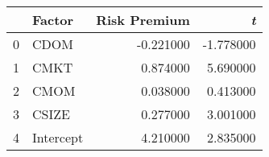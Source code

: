 \begin{tabular}{llrr}
\toprule
 & Factor & Risk Premium & \emph{t} \\
\midrule
0 & CDOM & -0.221000 & -1.778000 \\
1 & CMKT & 0.874000 & 5.690000 \\
2 & CMOM & 0.038000 & 0.413000 \\
3 & CSIZE & 0.277000 & 3.001000 \\
4 & Intercept & 4.210000 & 2.835000 \\
\bottomrule
\end{tabular}
